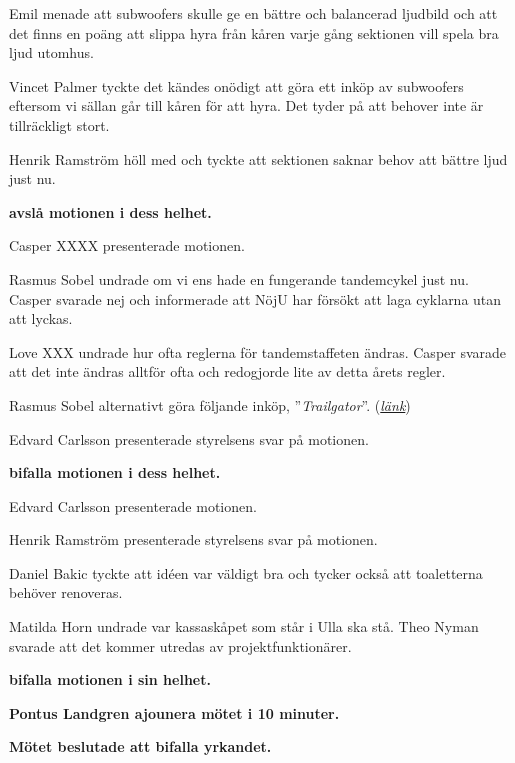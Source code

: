 \documentclass[10pt]{article}
\begin{document}
\begin{paragrafer}
\begin{paragrafer}
      Emil menade att subwoofers skulle ge en bättre och balancerad ljudbild och att det finns en poäng att slippa hyra från kåren varje gång sektionen vill spela bra ljud utomhus. 

      Vincet Palmer tyckte det kändes onödigt att göra ett inköp av subwoofers eftersom vi sällan går till kåren för att hyra. Det tyder på att behover inte är tillräckligt stort. 

      Henrik Ramström höll med och tyckte att sektionen saknar behov att bättre ljud just nu. 
 
      \textbf{\Mba avslå motionen i dess helhet. }

      Casper XXXX presenterade motionen. 

      Rasmus Sobel undrade om vi ens hade en fungerande tandemcykel just nu. Casper svarade nej och informerade att NöjU har försökt att laga cyklarna utan att lyckas. 

      Love XXX undrade hur ofta reglerna för tandemstaffeten ändras. Casper svarade att det inte ändras alltför ofta och redogjorde lite av detta årets regler.

      Rasmus Sobel \ypa alternativt göra följande inköp, ''\textit{Trailgator}''. (\href{https://www.atredo.se/paahngscyklar/trail-gator---dragstaang?gclid=EAIaIQobChMIjv7j6MPl5QIVE853Ch0QYwiuEAQYBSABEgKoHvD_BwE}{\textit{länk}})
      
      Edvard Carlsson presenterade styrelsens svar på motionen.  

      \textbf{\Mba bifalla motionen i dess helhet.}


      Edvard Carlsson presenterade motionen. 

      Henrik Ramström presenterade styrelsens svar på motionen. 
      
      Daniel Bakic tyckte att idéen var väldigt bra och tycker också att toaletterna behöver renoveras.  
      
      Matilda Horn undrade var kassaskåpet som står i Ulla ska stå. Theo Nyman svarade att det kommer utredas av projektfunktionärer.

      \textbf{\Mba bifalla motionen i sin helhet.}

      \textbf{Pontus Landgren \ypa ajounera mötet i 10 minuter.}

      \textbf{Mötet beslutade att bifalla yrkandet.}
      

\end{paragrafer}
\end{paragrafer}
\end{document}
